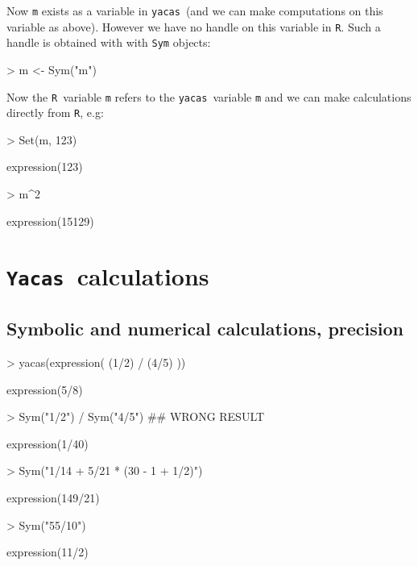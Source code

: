 \documentclass[10pt]{article}
\newcommand{\yacas}{{\tt yacas}}
\newcommand{\code}[1]{{\tt #1}}
\def\yac{\texttt{Yacas}}
\def\R{\texttt{R}}
\begin{document}
Now \code{m} exists as a variable in \yacas\ (and we
can make computations on this variable as above).
However we have no handle on
this variable in \R. Such a handle is obtained with with \verb'Sym'
objects:
\begin{Schunk}
\begin{Sinput}
> m <- Sym("m")
\end{Sinput}
\end{Schunk}
Now the \R\ variable \code{m} refers to the \yacas\ variable
\code{m} and we can make  calculations directly from \R, e.g:
\begin{Schunk}
\begin{Sinput}
> Set(m, 123)
\end{Sinput}
\begin{Soutput}
expression(123)
\end{Soutput}
\begin{Sinput}
> m^2
\end{Sinput}
\begin{Soutput}
expression(15129)
\end{Soutput}
\end{Schunk}


\section{\yac\ calculations}


\subsection{Symbolic and numerical calculations, precision}
\label{sec:algebr-calc}

\begin{Schunk}
\begin{Sinput}
> yacas(expression( (1/2) / (4/5) ))
\end{Sinput}
\begin{Soutput}
expression(5/8)
\end{Soutput}
\begin{Sinput}
> Sym("1/2") / Sym("4/5") ## WRONG RESULT
\end{Sinput}
\begin{Soutput}
expression(1/40)
\end{Soutput}
\begin{Sinput}
> Sym("1/14 + 5/21 * (30 - 1 + 1/2)")
\end{Sinput}
\begin{Soutput}
expression(149/21)
\end{Soutput}
\begin{Sinput}
> Sym("55/10")
\end{Sinput}
\begin{Soutput}
expression(11/2)
\end{Soutput}
\end{Schunk}
\end{document}
